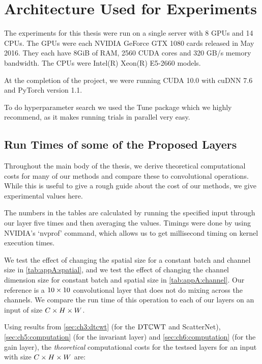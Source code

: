 \chapter{Architecture Used for Experiments} \label{app:arch}
\def \path {dtcwt_scat}
\def \imgpath {\path/images}

The experiments for this thesis were run on a single server with 8 GPUs and 14
CPUs. The GPUs were each NVIDIA GeForce GTX 1080 cards released in May 2016.
They each have 8GiB of RAM, 2560 CUDA cores and 320 GB/s memory bandwidth.
The CPUs were Intel(R) Xeon(R) E5-2660 models. 

At the completion of the project, we were running CUDA 10.0 with cuDNN 7.6 and 
PyTorch version 1.1.

To do hyperparameter search we used the Tune package \cite{liaw2018tune} which
we highly recommend, as it makes running trials in parallel very easy.

\section{Run Times of some of the Proposed Layers}
Throughout the main body of the thesis, we derive theoretical computational
costs for many of our methods and compare these to convolutional operations.
While this is useful to give a rough guide about the cost of our methods, we
give experimental values here. 

The numbers in the tables are calculated by running the specified input through our
layer five times and then averaging the values. Timings were done by using
NVIDIA's `nvprof' command, which allows us to get millisecond timing on kernel
execution times.

We test the effect of changing the spatial size for a constant batch and channel
size in \autoref{tab:appA:spatial}, and we test the effect of changing the
channel dimension size for constant batch and spatial size in
\autoref{tab:appA:channel}. Our reference is a $10\times 10$ convolutional layer
that does not do mixing across the channels. We compare the run time of this operation
to each of our layers on an input of size $C\times H\times W$.

Using results from \autoref{sec:ch3:dtcwt} (for the $\mathrm{DT}\mathbb{C}\mathrm{WT}$ and ScatterNet),
\autoref{sec:ch5:computation} (for the invariant layer) and
\autoref{sec:ch6:computation} (for the gain layer), the \emph{theoretical}
computational costs for the testsed layers for an input with size $C\times H\times W$
are:


